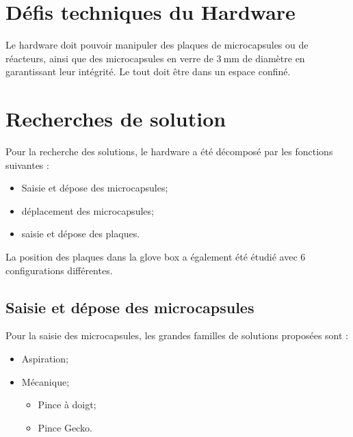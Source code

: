 \section{Défis techniques du Hardware}
Le hardware doit pouvoir manipuler des plaques de microcapsules ou de réacteurs, ainsi que des microcapsules en verre de $\qty{3}{\mm}$ de diamètre en garantissant leur intégrité. Le tout doit être dans un espace confiné.
\section{Recherches de solution}
Pour la recherche des solutions, le hardware a été décomposé par les fonctions suivantes : 
\begin{itemize}
    \item Saisie et dépose des microcapsules;
    \item déplacement des microcapsules;
    \item saisie et dépose des plaques.
\end{itemize} 
La position des plaques dans la glove box a également été étudié avec $6$ configurations différentes.
\subsection{Saisie et dépose des microcapsules}
Pour la saisie des microcapsules, les grandes familles de solutions proposées sont : 
\begin{itemize}
    \item Aspiration;
    \item Mécanique; \begin{itemize}
        \item Pince à doigt;
        \item Pince Gecko.
    \end{itemize}
\end{itemize}

